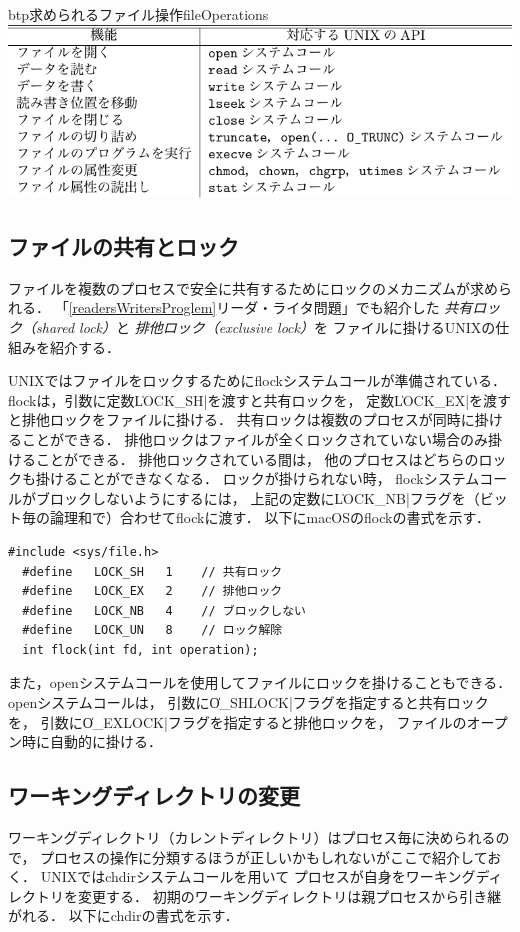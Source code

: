\begin{mytable}{btp}{求められるファイル操作}{fileOperations}
  \includegraphics[scale=1.0]{Tbl/fileOperations.pdf}
\end{mytable}

\subsection{ファイルの共有とロック}
ファイルを複数のプロセスで安全に共有するためにロックのメカニズムが求められる．
「\ref{readersWritersProglem}リーダ・ライタ問題」でも紹介した
\emph{共有ロック（shared lock）}と
\emph{排他ロック（exclusive lock）}を
ファイルに掛けるUNIXの仕組みを紹介する．

UNIXではファイルをロックするためにflockシステムコールが準備されている．
flockは，引数に定数\|LOCK_SH|を渡すと共有ロックを，
定数\|LOCK_EX|を渡すと排他ロックをファイルに掛ける．
共有ロックは複数のプロセスが同時に掛けることができる．
排他ロックはファイルが全くロックされていない場合のみ掛けることができる．
排他ロックされている間は，
他のプロセスはどちらのロックも掛けることができなくなる．
ロックが掛けられない時，
flockシステムコールがブロックしないようにするには，
上記の定数に\|LOCK_NB|フラグを（ビット毎の論理和で）合わせてflockに渡す．
以下にmacOSのflockの書式を示す．

\newpage
\begin{lstlisting}[numbers=none]
  #include <sys/file.h>
  #define   LOCK_SH   1    // 共有ロック
  #define   LOCK_EX   2    // 排他ロック
  #define   LOCK_NB   4    // ブロックしない
  #define   LOCK_UN   8    // ロック解除
  int flock(int fd, int operation);
\end{lstlisting}

また，openシステムコールを使用してファイルにロックを掛けることもできる．
openシステムコールは，
引数に\|O_SHLOCK|フラグを指定すると共有ロックを，
引数に\|O_EXLOCK|フラグを指定すると排他ロックを，
ファイルのオープン時に自動的に掛ける．

\subsection{ワーキングディレクトリの変更}
ワーキングディレクトリ（カレントディレクトリ）はプロセス毎に決められるので，
プロセスの操作に分類するほうが正しいかもしれないがここで紹介しておく．
UNIXではchdirシステムコールを用いて
プロセスが自身をワーキングディレクトリを変更する．
初期のワーキングディレクトリは親プロセスから引き継がれる．
以下にchdirの書式を示す．


